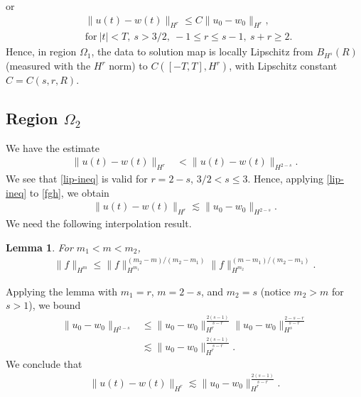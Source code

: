 \documentclass[12pt,reqno]{amsart}
\numberwithin{equation}{section}  %
\numberwithin{figure}{section}
\newtheorem{lemma}[theorem]{Lemma}
\begin{document}
%
%
or
%
%
\begin{equation}
\label{lip-ineq}
\begin{split}
& \| u(t) - w(t) \|_{H^{r}} \le C \| u_{0} - w_{0} \|_{H^{r}}, 
\\
& \text{for} \ | t | < T,
\ s > 3/2, \ -1 \le r \le s-1, \ s + r \ge 2.
\end{split}
\end{equation}
%
Hence, in region $\Omega_{1}$, the data to solution map is locally Lipschitz from
$B_{H^{s}}(R)$ (measured with the $H^{r}$
norm) to $C([-T, T], H^{r})$, with Lipschitz constant $C = C(s, r, R)$.
%
%
%
%
%
%
%
%
%
%
\subsection{Region $\Omega_{2}$} 
\label{ssec:case-4}
%
We have the estimate
\begin{equation}
\label{fgh}
\begin{split}
\| u(t) - w(t) \|_{H^{r}}
& < \|u(t) - w(t) \|_{H^{2-s}}.
\end{split}
\end{equation}
%
We see that \eqref{lip-ineq} is valid for $r = 2-s$, $3/2 < s \le 3$.
Hence, applying \eqref{lip-ineq} to \eqref{fgh}, we obtain 
%
%
%
%
\begin{equation*}
\begin{split}
\| u(t) - w(t) \|_{H^{r}}
\lesssim \|u_{0} - w_{0} \|_{H^{2-s}}.
\end{split}
\end{equation*}
%
%
%
%
%
We need the following interpolation
result. 
%
%
%
%
%
%
%
%
\begin{lemma}
For $m_{1} < m < m_{2}$,
%
%
\begin{equation*}
\begin{split}
\| f \|_{H^{m}} \le \| f \|_{H^{m_{1}}}^{(m_{2}-m)/(m_{2} - m_{1})} \| f
\|_{H^{m_{2}}}^{(m -m_{1})/(m_{2} - m_{1})}.
\end{split}
\end{equation*}
%
%
%
%
%
%
\label{lem:interp}
\end{lemma}
%
Applying the lemma with $m_{1} =r$, $m = 2-s$, and $m_{2} = s$ (notice
$m_{2} > m$ for $s > 1$), we bound 
%
%
\begin{equation*}
\begin{split}
\| u_{0} - w_{0} \|_{H^{2-s}} 
& \le \| u_{0} - w_{0} \|_{H^{r}}^{\frac{2(s-1)}{s-r}} \| u_{0} - w_{0}
\|_{H^{s}}^{\frac{2-s-r}{s-r}}
\\
&  \lesssim \| u_{0} - w_{0} \|_{H^{r}}^{\frac{2(s-1)}{s-r}}.
\end{split}
\end{equation*}
%
We conclude that
%
%
\begin{equation*}
\begin{split}
\| u(t) - w(t) \|_{H^{r}} \lesssim \|u_{0} - w_{0} \|_{H^{r}}^{\frac{2(s-1)}{s-r}}.
\end{split}
\end{equation*}
%
%
%
%
\end{document}
